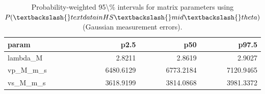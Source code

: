 \begin{table}[ht!]
\centering
\caption{Probability-weighted 95\textbackslash{}\% intervals for matrix parameters using $P(\textbackslash{}text{data in HS}\textbackslash{}mid\textbackslash{}theta)$ (Gaussian measurement errors).}
\label{tab:hs\_prob\_weighted\_95ci}
\begin{tabular}{lrrr}
\toprule
\textbf{param} & \textbf{p2.5} & \textbf{p50} & \textbf{p97.5} \\
\midrule
lambda\_M & 2.8211 & 2.8619 & 2.9027 \\
vp\_M\_m\_s & 6480.6129 & 6773.2184 & 7120.9465 \\
vs\_M\_m\_s & 3618.9199 & 3814.0868 & 3981.3372 \\
\bottomrule
\end{tabular}
\end{table}
